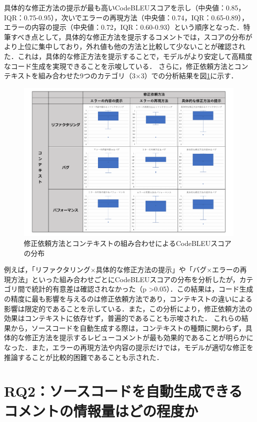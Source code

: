 \documentclass[11pt]{jreport}
\newcommand{\RQtwo}{ソースコードを自動生成できるコメントの情報量はどの程度か}
\begin{document}
具体的な修正方法の提示が最も高いCodeBLEUスコアを示し（中央値：0.85，IQR：0.75-0.95），次いでエラーの再現方法（中央値：0.74，IQR：0.65-0.89），エラーの内容の提示（中央値：0.72，IQR：0.60-0.93）という順序となった．特筆すべき点として，具体的な修正方法を提示するコメントでは，スコアの分布がより上位に集中しており，外れ値も他の方法と比較して少ないことが確認された．これは，具体的な修正方法を提示することで，モデルがより安定して高精度なコード生成を実現できることを示唆している．
さらに，修正依頼方法とコンテキストを組み合わせた9つのカテゴリ（3×3）での分析結果を図\ref{fig:matrix-score}に示す．
\begin{figure}[htbp]
\centering
\includegraphics[width=0.9\linewidth]{@BSthesis2024_Akamatsu/Akamatsu_figs/rq1_result01.pdf}
\caption{修正依頼方法とコンテキストの組み合わせによるCodeBLEUスコアの分布}
\label{fig:matrix-score}
\end{figure}
例えば，「リファクタリング×具体的な修正方法の提示」や「バグ×エラーの再現方法」といった組み合わせごとにCodeBLEUスコアの分布を分析したが，カテゴリ間で統計的有意差は確認されなかった（p \textgreater 0.05）．この結果は，コード生成の精度に最も影響を与えるのは修正依頼方法であり，コンテキストの違いによる影響は限定的であることを示している．また，この分析により，修正依頼方法の効果はコンテキストに依存せず，普遍的であることも示唆された．
これらの結果から，ソースコードを自動生成する際は，コンテキストの種類に関わらず，具体的な修正方法を提示するレビューコメントが最も効果的であることが明らかになった．また，エラーの再現方法や内容の提示だけでは，モデルが適切な修正を推論することが比較的困難であることも示された．


\chapter{RQ2：\RQtwo}\label{chap:fig-tab-exp}
\end{document}
